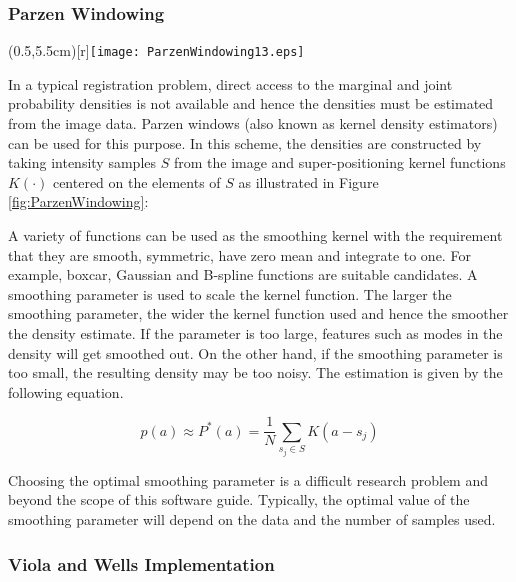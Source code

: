 \subsubsection{Parzen Windowing}

\parpic(0.5\textwidth,5.5cm)[r]{\texttt{[image: ParzenWindowing13.eps]}}

In a typical registration problem, direct access to the marginal 
and joint probability densities is not available and hence the
densities must be estimated from the image data. Parzen windows 
(also known as kernel density estimators) can be used for this purpose.
In this scheme, the densities are constructed by taking intensity 
samples $S$ from the image and super-positioning kernel functions 
$K(\cdot)$ centered on the elements of $S$ as illustrated in
Figure \ref{fig:ParzenWindowing}:

A variety of functions can be used as the smoothing kernel with the
requirement that they are smooth, symmetric, have zero mean and
integrate to one. For example, boxcar, Gaussian and B-spline functions are
suitable candidates.  A smoothing parameter is used to scale the kernel
function.  The larger the smoothing parameter, the wider the kernel function
used and hence the smoother the density estimate. If the parameter is too
large, features such as modes in the density will get smoothed out.  On the
other hand, if the smoothing parameter is too small, the resulting density
may be too noisy. The estimation is given by the following equation.

\begin{equation}
p(a) \approx P^{*}(a) = \frac{1}{N} \sum_{s_j \in S} K\left(a - s_j\right)
\end{equation}

Choosing the optimal smoothing parameter is a difficult research problem and
beyond the scope of this software guide.  Typically, the optimal value of the
smoothing parameter will depend on the data and the number of samples used.

\subsubsection{Viola and Wells Implementation}

